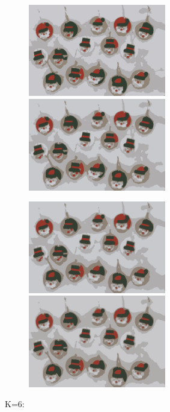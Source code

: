 \begin{center}
\begin{figure}[H]
\centering\includegraphics[width=6cm]{./imgkmeanscluster05-02.png}
\centering\includegraphics[width=6cm]{./imgkmeanscluster05-03.png}\\
\end{figure}
\end{center}
\begin{center}
\begin{figure}[H]
\centering\includegraphics[width=6cm]{./imgkmeanscluster05-04.png}
\centering\includegraphics[width=6cm]{./imgkmeanscluster05-05.png}\\
\end{figure}
\end{center}
K=6:\\
